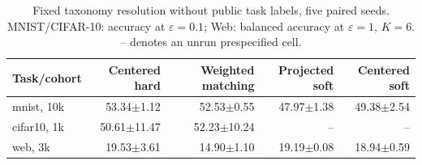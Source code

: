 \begin{table}[t]
\caption{Fixed taxonomy resolution without public task labels, five paired seeds. MNIST/CIFAR-10: accuracy at $\varepsilon=0.1$; Web: balanced accuracy at $\varepsilon=1$, $K=6$. -- denotes an unrun prespecified cell.}
\label{tab:decoder-transfer}\small
\centering
\begin{tabular}{@{}lrrrr@{}}\toprule
Task/cohort & Centered hard & Weighted matching & Projected soft & Centered soft \\
\midrule
mnist, 10k & 53.34$\pm$1.12 & 52.53$\pm$0.55 & 47.97$\pm$1.38 & 49.38$\pm$2.54 \\
cifar10, 1k & 50.61$\pm$11.47 & 52.23$\pm$10.24 & -- & -- \\
web, 3k & 19.53$\pm$3.61 & 14.90$\pm$1.10 & 19.19$\pm$0.08 & 18.94$\pm$0.59 \\
\bottomrule\end{tabular}
\end{table}
